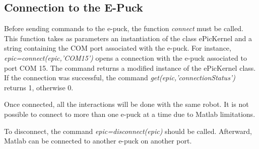 \documentclass[11pt,oneside,english,a4paper]{article}
\begin{document}
\subsection{Connection to the E-Puck}
Before sending commands to the e-puck, the function \emph{connect} must be called. This function takes as parameters an instantiation of the class ePicKernel and a string containing the COM port associated with the e-puck. For instance,  \emph{epic=connect(epic,'COM15')} opens a connection with the e-puck associated to port COM 15. The command returns a modified instance of the ePicKernel class. If the connection was successful, the command \emph{get(epic,'connectionStatus')} returns 1, otherwise 0.
\par Once connected, all the interactions will be done with the same robot. It is not possible to connect to more than one e-puck at a time due to Matlab limitations.
\par To disconnect, the command \emph{epic=disconnect(epic)} should be called. Afterward, Matlab can be connected to another e-puck on another port.
\end{document}

